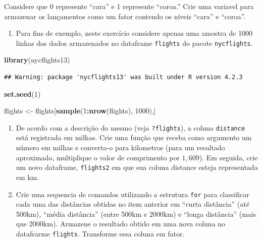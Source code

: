 \documentclass[
]{book}
\newenvironment{Shaded}{\begin{snugshade}}{\end{snugshade}}
\newcommand{\DecValTok}[1]{\textcolor[rgb]{0.00,0.00,0.81}{#1}}
\newcommand{\FunctionTok}[1]{\textcolor[rgb]{0.13,0.29,0.53}{\textbf{#1}}}
\newcommand{\NormalTok}[1]{#1}
\newcommand{\OtherTok}[1]{\textcolor[rgb]{0.56,0.35,0.01}{#1}}
\newcommand{\SpecialCharTok}[1]{\textcolor[rgb]{0.81,0.36,0.00}{\textbf{#1}}}
\providecommand{\tightlist}{%
  \setlength{\itemsep}{0pt}\setlength{\parskip}{0pt}}
\begin{document}
Considere que 0 represente ``cara'' e 1 represente ``coroa.'' Crie uma variavel para armazenar os lançamentos como um fator contendo os níveis ``cara'' e ``coroa''.

\begin{enumerate}
\def\labelenumi{\arabic{enumi}.}
\setcounter{enumi}{1}
\tightlist
\item
  Para fins de exemplo, neste exercício considere apenas uma amostra de 1000 linhas dos dados armazenados no dataframe \texttt{flights} do pacote \texttt{nycflights}.
\end{enumerate}

\begin{Shaded}
\begin{Highlighting}[]
\FunctionTok{library}\NormalTok{(nycflights13)}
\end{Highlighting}
\end{Shaded}

\begin{verbatim}
## Warning: package 'nycflights13' was built under R version 4.2.3
\end{verbatim}

\begin{Shaded}
\begin{Highlighting}[]
\FunctionTok{set.seed}\NormalTok{(}\DecValTok{1}\NormalTok{)}

\NormalTok{flights }\OtherTok{\textless{}{-}}\NormalTok{ flights[}\FunctionTok{sample}\NormalTok{(}\DecValTok{1}\SpecialCharTok{:}\FunctionTok{nrow}\NormalTok{(flights), }\DecValTok{1000}\NormalTok{),]}
\end{Highlighting}
\end{Shaded}

\begin{enumerate}
\def\labelenumi{\alph{enumi})}
\item
  De acordo com a descrição do mesmo (veja \texttt{?flights}), a coluna \texttt{distance} está registrada em milhas. Crie uma função que receba como argumento um número em milhas e converta-o para kilometros (para um resultado aproximado, multiplique o valor de comprimento por \(1{,}609\)). Em seguida, crie um novo dataframe, \texttt{flights2} em que sua coluna distance esteja representada em km.
\item
  Crie uma sequencia de comandos utilizando a estrutura \texttt{for} para classificar cada uma das distâncias obtidas no item anterior em ``curta distância'' (até 500km), ``média distância'' (entre 500km e 2000km) e ``longa distância'' (mais que 2000km). Armazene o resultado obtido em uma nova coluna no datafrarme \texttt{flights}. Transforme essa coluna em fator.
\end{enumerate}
\end{document}
